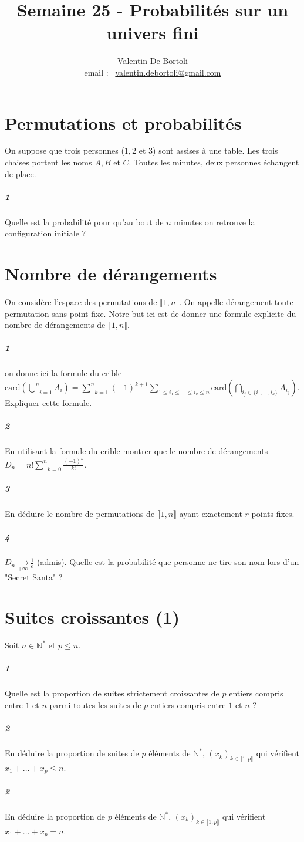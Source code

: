 \documentclass[10pt,a4paper]{article}
\title{Semaine 25 - Probabilités sur un univers fini}
\author{Valentin De Bortoli \\ email : \ \href{mailto:valentin.debortoli@gmail.com}{valentin.debortoli@gmail.com}}
\date{}
\begin{document}
\maketitle
\section{Permutations et probabilités}
On suppose que trois personnes ($1,2$ et $3$) sont assises à une table. Les trois chaises portent les noms $A,B$ et $C$. Toutes les minutes, deux personnes échangent de place.
\subparagraph{1}Quelle est la probabilité pour qu'au bout de $n$ minutes on retrouve la configuration initiale ?

\section{Nombre de dérangements}
On considère l'espace des permutations de $\llbracket 1,n \rrbracket$. On appelle dérangement toute permutation sans point fixe. Notre but ici est de donner une formule explicite du nombre de dérangements de $\llbracket 1,n \rrbracket$.
\subparagraph{1} on donne ici la formule du crible $\text{card} \left( \underset{i=1}{\overset{n}{\bigcup}} A_i \right) = \underset{k=1}{\overset{n}{\sum}}(-1)^{k+1} \underset{1\le i_1 \le \dots \le i_k \le n}{\sum} \text{card} \left( \underset{i_j  \in \lbrace i_1,\dots,i_k \rbrace }{\bigcap} A_{i_j} \right)$. Expliquer cette formule.
\subparagraph{2}En utilisant la formule du crible montrer que le nombre de dérangements $D_n = n! \underset{k=0}{\overset{n}{\sum}} \frac{(-1)^k}{k!}$.
\subparagraph{3}En déduire le nombre de permutations de $\llbracket 1,n \rrbracket$ ayant exactement $r$ points fixes.
\subparagraph{4}$D_n \underset{+\infty}{\rightarrow} \frac{1}{e}$ (admis). Quelle est la probabilité que personne ne tire son nom lors d'un "Secret Santa" ?


\section{Suites croissantes (1)}
Soit $n \in \mathbb{N}^*$ et $p \le n$.
\subparagraph{1}Quelle est la proportion de suites strictement croissantes de $p$ entiers compris entre $1$ et $n$ parmi toutes les suites de $p$ entiers compris entre $1$ et $n$ ?
\subparagraph{2}En déduire la proportion de suites de $p$ éléments de $\mathbb{N}^*$, $(x_k)_{k \in \llbracket 1,p \rrbracket}$ qui vérifient $x_1 + \dots + x_p \le n$.
\subparagraph{2}En déduire la proportion de $p$ éléments de $\mathbb{N}^*$, $(x_k)_{k \in \llbracket 1,p \rrbracket}$ qui vérifient $x_1 + \dots + x_p = n$.
\end{document}
